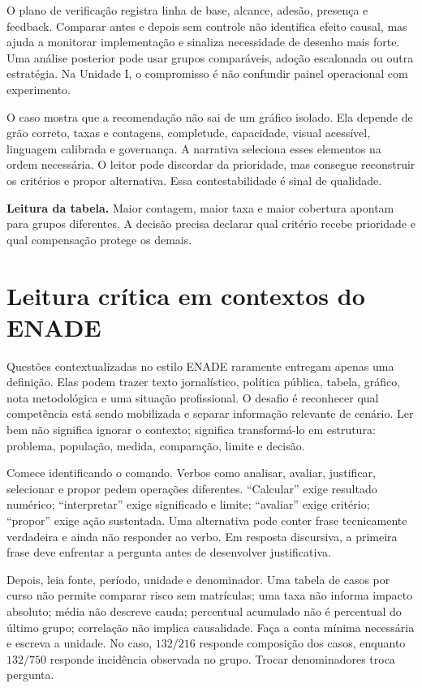 O plano de verificação registra linha de base, alcance, adesão, presença e feedback. Comparar antes e depois sem controle não identifica efeito causal, mas ajuda a monitorar implementação e sinaliza necessidade de desenho mais forte. Uma análise posterior pode usar grupos comparáveis, adoção escalonada ou outra estratégia. Na Unidade I, o compromisso é não confundir painel operacional com experimento.

O caso mostra que a recomendação não sai de um gráfico isolado. Ela depende de grão correto, taxas e contagens, completude, capacidade, visual acessível, linguagem calibrada e governança. A narrativa seleciona esses elementos na ordem necessária. O leitor pode discordar da prioridade, mas consegue reconstruir os critérios e propor alternativa. Essa contestabilidade é sinal de qualidade.

\begin{GuidedBox}
\textbf{Leitura da tabela.} Maior contagem, maior taxa e maior cobertura apontam para grupos diferentes. A decisão precisa declarar qual critério recebe prioridade e qual compensação protege os demais.
\end{GuidedBox}

\section{Leitura crítica em contextos do ENADE}

Questões contextualizadas no estilo ENADE raramente entregam apenas uma definição. Elas podem trazer texto jornalístico, política pública, tabela, gráfico, nota metodológica e uma situação profissional. O desafio é reconhecer qual competência está sendo mobilizada e separar informação relevante de cenário. Ler bem não significa ignorar o contexto; significa transformá-lo em estrutura: problema, população, medida, comparação, limite e decisão.

Comece identificando o comando. Verbos como analisar, avaliar, justificar, selecionar e propor pedem operações diferentes. ``Calcular'' exige resultado numérico; ``interpretar'' exige significado e limite; ``avaliar'' exige critério; ``propor'' exige ação sustentada. Uma alternativa pode conter frase tecnicamente verdadeira e ainda não responder ao verbo. Em resposta discursiva, a primeira frase deve enfrentar a pergunta antes de desenvolver justificativa.

Depois, leia fonte, período, unidade e denominador. Uma tabela de casos por curso não permite comparar risco sem matrículas; uma taxa não informa impacto absoluto; média não descreve cauda; percentual acumulado não é percentual do último grupo; correlação não implica causalidade. Faça a conta mínima necessária e escreva a unidade. No caso, $132/216$ responde composição dos casos, enquanto $132/750$ responde incidência observada no grupo. Trocar denominadores troca pergunta.

